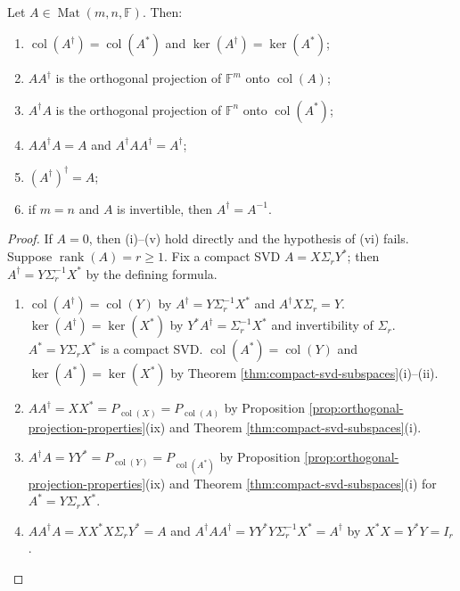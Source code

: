 \begin{theorem} \label{thm:moore-penrose-basic-properties} \\
Let $A\in\operatorname{Mat}(m,n,\mathbb{F})$. Then:
\begin{enumerate}[label=(\roman*)]
\setlength{\itemsep}{0pt}
\item $\operatorname{col}(A^{\dagger})=\operatorname{col}(A^*)$ and $\ker(A^{\dagger})=\ker(A^*)$;
\item $AA^{\dagger}$ is the orthogonal projection of $\mathbb{F}^m$ onto $\operatorname{col}(A)$;
\item $A^{\dagger}A$ is the orthogonal projection of $\mathbb{F}^n$ onto $\operatorname{col}(A^*)$;
\item $AA^{\dagger}A=A$ and $A^{\dagger}AA^{\dagger}=A^{\dagger}$;
\item $(A^{\dagger})^{\dagger}=A$;
\item if $m=n$ and $A$ is invertible, then $A^{\dagger}=A^{-1}$.
\end{enumerate}
\begin{proof}
If $A=0$, then (i)--(v) hold directly and the hypothesis of (vi) fails.\\
Suppose $\operatorname{rank}(A)=r\geq1$. Fix a compact SVD $A=X\Sigma_rY^*$; then $A^{\dagger}=Y\Sigma_r^{-1}X^*$ by the defining formula.
\begin{enumerate}[label=(\roman*)]
\setlength{\itemsep}{0pt}
\item $\operatorname{col}(A^{\dagger})=\operatorname{col}(Y)$ by $A^{\dagger}=Y\Sigma_r^{-1}X^*$ and $A^{\dagger}X\Sigma_r=Y$. $\ker(A^{\dagger})=\ker(X^*)$ by $Y^*A^{\dagger}=\Sigma_r^{-1}X^*$ and invertibility of $\Sigma_r$.\\
$A^*=Y\Sigma_rX^*$ is a compact SVD. $\operatorname{col}(A^*)=\operatorname{col}(Y)$ and $\ker(A^*)=\ker(X^*)$ by Theorem \ref{thm:compact-svd-subspaces}(i)--(ii).
\item $AA^{\dagger}=XX^*=P_{\operatorname{col}(X)}=P_{\operatorname{col}(A)}$ by Proposition \ref{prop:orthogonal-projection-properties}(ix) and Theorem \ref{thm:compact-svd-subspaces}(i).
\item $A^{\dagger}A=YY^*=P_{\operatorname{col}(Y)}=P_{\operatorname{col}(A^*)}$ by Proposition \ref{prop:orthogonal-projection-properties}(ix) and Theorem \ref{thm:compact-svd-subspaces}(i) for $A^*=Y\Sigma_rX^*$.
\item $AA^{\dagger}A=XX^*X\Sigma_rY^*=A$ and $A^{\dagger}AA^{\dagger}=YY^*Y\Sigma_r^{-1}X^*=A^{\dagger}$ by $X^*X=Y^*Y=I_r$.

\end{enumerate}
\end{proof}
\end{theorem}
